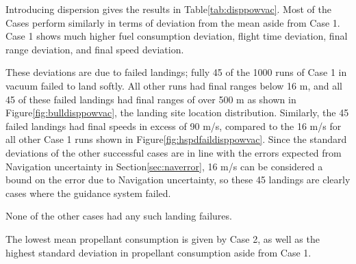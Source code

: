Introducing dispersion gives the results in Table\:\ref{tab:disppowvac}. Most of the Cases perform similarly in terms of deviation from the mean aside from Case 1. Case 1 shows much higher fuel consumption deviation, flight time deviation, final range deviation, and final speed deviation. 

These deviations are due to failed landings; fully 45 of the 1000 runs of Case 1 in vacuum failed to land softly. All other runs had final ranges below 16 m, and all 45 of these failed landings had final ranges of over 500 m as shown in Figure\:\ref{fig:bulldisppowvac}, the landing site location distribution. Similarly, the 45 failed landings had final speeds in excess of 90 m/s, compared to the 16 m/s for all other Case 1 runs shown in Figure\:\ref{fig:hspdfaildisppowvac}. Since the standard deviations of the other successful cases are in line with the errors expected from Navigation uncertainty in Section\:\ref{sec:naverror}, 16 m/s can be considered a bound on the error due to Navigation uncertainty, so these 45 landings are clearly cases where the guidance system failed.

None of the other cases had any such landing failures.

The lowest mean propellant consumption is given by Case 2, as well as the highest standard deviation in propellant consumption aside from Case 1.

